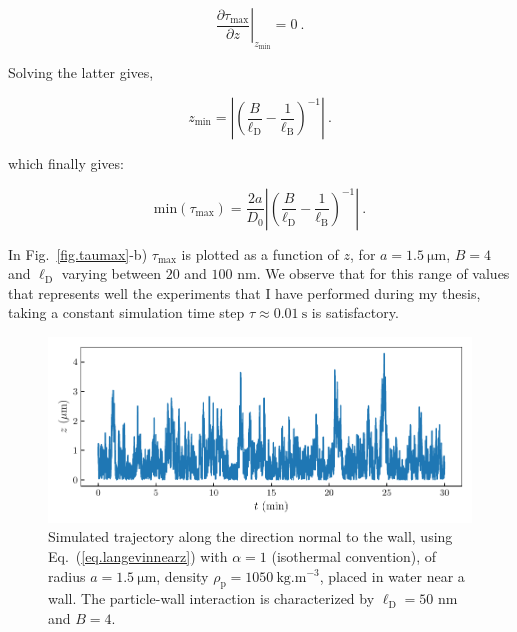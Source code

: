 \begin{equation}
	\left. \frac{\partial \tau_\mathrm{max}}{\partial z} \right| _{z_\mathrm{min} }= 0 ~.
\end{equation} 

Solving the latter gives,

\begin{equation}
	z_\mathrm{min} = \left| \left( \frac{B}{\ell_\mathrm{D}} - \frac{1}{\ell_{\mathrm{B}}}\right)^{-1} \right|~.
\end{equation}


which finally gives:

\begin{equation}
	\mathrm{min}(\tau_\mathrm{max}) =  \frac{2 a}{D_0}  \left| \left( \frac{B}{\ell_\mathrm{D}} - \frac{1}{\ell_{\mathrm{B}}}\right)^{-1} \right| ~.
\end{equation}

In Fig.~\ref{fig.taumax}-b) $\tau_{\mathrm{max}}$ is plotted as a function of $z$, for $a=1.5 ~\mathrm{\mu m}$, $B = 4$ and $\ell _\mathrm{D}$ varying between $20$ and $100$ nm. We observe that for this range of values that represents well the experiments that I have performed during my thesis, taking a constant simulation time step $\tau \approx 0.01 ~ \mathrm{s}$ is satisfactory.

\begin{figure}[H]
	\centering
	\includegraphics{02_body/chapter3/images/simulation_confined_Brownian_motion/z_traj_sim.pdf}
	\caption{Simulated trajectory along the direction normal to the wall, using Eq.~(\ref{eq.langevinnearz}) with $\alpha = 1$ (isothermal convention), of radius $a= 1.5  ~ \mathrm{\mu m}$, density $\rho_\mathrm{p} = 1050  ~\mathrm{kg.m^{-3}}$, placed in water near a wall. The particle-wall interaction is characterized by $\ell_\mathrm{D} = 50$ nm and $B=4$. \href{https://github.com/eXpensia/Confined-Brownian-Motion/blob/main/02_body/chapter3/images/simulation_confined_Brownian_motion/Overdamped_confined_simulation.ipynb}{\faGithub}} 
	\label{fig.z_traj_confined_simulated}
\end{figure}

